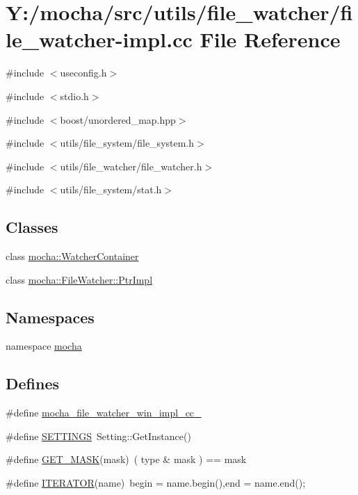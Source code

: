 \hypertarget{file__watcher-impl_8cc}{
\section{Y:/mocha/src/utils/file\_\-watcher/file\_\-watcher-\/impl.cc File Reference}
\label{file__watcher-impl_8cc}
}
{\ttfamily \#include $<$useconfig.h$>$}\par
{\ttfamily \#include $<$stdio.h$>$}\par
{\ttfamily \#include $<$boost/unordered\_\-map.hpp$>$}\par
{\ttfamily \#include $<$utils/file\_\-system/file\_\-system.h$>$}\par
{\ttfamily \#include $<$utils/file\_\-watcher/file\_\-watcher.h$>$}\par
{\ttfamily \#include $<$utils/file\_\-system/stat.h$>$}\par
\subsection*{Classes}
\begin{DoxyCompactItemize}
\item 
class \hyperlink{classmocha_1_1_watcher_container}{mocha::WatcherContainer}
\item 
class \hyperlink{classmocha_1_1_file_watcher_1_1_ptr_impl}{mocha::FileWatcher::PtrImpl}
\end{DoxyCompactItemize}
\subsection*{Namespaces}
\begin{DoxyCompactItemize}
\item 
namespace \hyperlink{namespacemocha}{mocha}
\end{DoxyCompactItemize}
\subsection*{Defines}
\begin{DoxyCompactItemize}
\item 
\#define \hyperlink{file__watcher-impl_8cc_a77667bff91912af241d2fdf2b7a13556}{mocha\_\-file\_\-watcher\_\-win\_\-impl\_\-cc\_\-}
\item 
\#define \hyperlink{file__watcher-impl_8cc_aa2d5c758628dddfa26e73ca5a245222a}{SETTINGS}~Setting::GetInstance()
\item 
\#define \hyperlink{file__watcher-impl_8cc_a69654895e069baa5ac52071dfecac957}{GET\_\-MASK}(mask)~( type \& mask ) == mask
\item 
\#define \hyperlink{file__watcher-impl_8cc_a06b931da68cc0b7db1b442bf1552a5d5}{ITERATOR}(name)~begin = name.begin(),end = name.end();
\end{DoxyCompactItemize}


